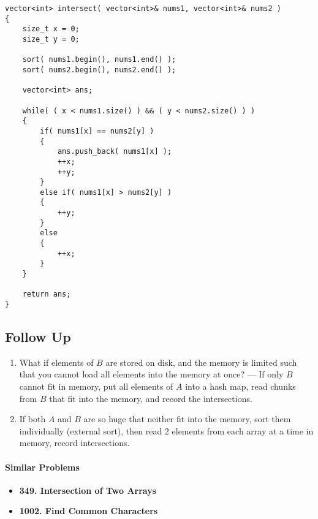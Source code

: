 \setcounter{lstlisting}{0}
\begin{lstlisting}[style=customc, caption={Sorting}]
vector<int> intersect( vector<int>& nums1, vector<int>& nums2 )
{
    size_t x = 0;
    size_t y = 0;

    sort( nums1.begin(), nums1.end() );
    sort( nums2.begin(), nums2.end() );

    vector<int> ans;

    while( ( x < nums1.size() ) && ( y < nums2.size() ) )
    {
        if( nums1[x] == nums2[y] )
        {
            ans.push_back( nums1[x] );
            ++x;
            ++y;
        }
        else if( nums1[x] > nums2[y] )
        {
            ++y;
        }
        else
        {
            ++x;
        }
    }

    return ans;
}
\end{lstlisting}

\subsection{Follow Up}
\begin{enumerate}
\item What if elements of $B$ are stored on disk, and the memory is
limited such that you cannot load all elements into the memory at
once? --- If only $B$ cannot fit in memory, put all elements of $A$ into a hash map, read chunks from $B$ that fit into the memory, and record the intersections.
\item If both $ A $ and $ B $ are so huge that neither fit into the memory, sort them individually (external sort), then read 2 elements from each array at a time in memory, record intersections.
\end{enumerate}

\paragraph{Similar Problems}
\begin{itemize}
\item \textbf{349. Intersection of Two Arrays}
\item \textbf{1002. Find Common Characters}
\end{itemize}